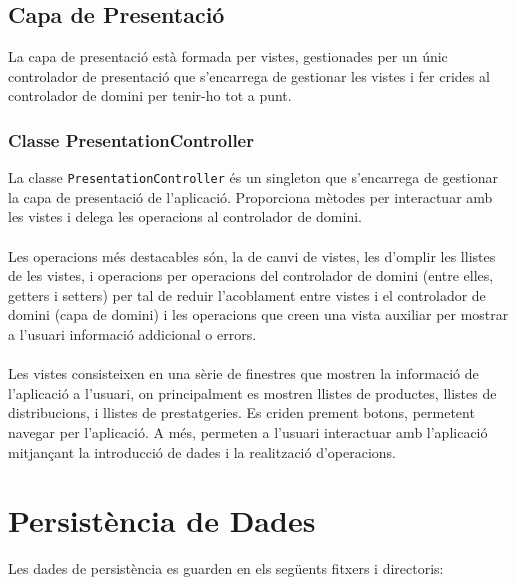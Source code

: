 \documentclass[a4paper, t]{article}
\begin{document}
\newpage

\subsection{Capa de Presentació}

La capa de presentació està formada per vistes, gestionades per un únic controlador de presentació 
que s’encarrega de gestionar les vistes i fer crides al controlador de domini per tenir-ho tot a punt.

\subsubsection{Classe PresentationController}
La classe \texttt{PresentationController} és un singleton que s'encarrega de gestionar la capa de presentació de l'aplicació. 
Proporciona mètodes per interactuar amb les vistes i delega les operacions al controlador de domini.
\\ \\
\noindent Les operacions més destacables són, la de canvi de vistes, les d’omplir les llistes de les vistes, 
i operacions per operacions del controlador de domini (entre elles, getters i setters) per tal de
reduir l’acoblament entre vistes i el controlador de domini (capa de domini) 
i les operacions que creen una vista auxiliar per mostrar a l’usuari informació addicional o errors.
\\ \\
\noindent Les vistes consisteixen en una sèrie de finestres que mostren la informació de l'aplicació a l'usuari,
on principalment es mostren llistes de productes, llistes de distribucions, i llistes de prestatgeries.
Es criden prement botons, permetent navegar per l'aplicació. A més, permeten a l'usuari interactuar amb l'aplicació
mitjançant la introducció de dades i la realització d'operacions.

\section{Persistència de Dades}

Les dades de persistència es guarden en els següents fitxers i directoris:
\end{document}
